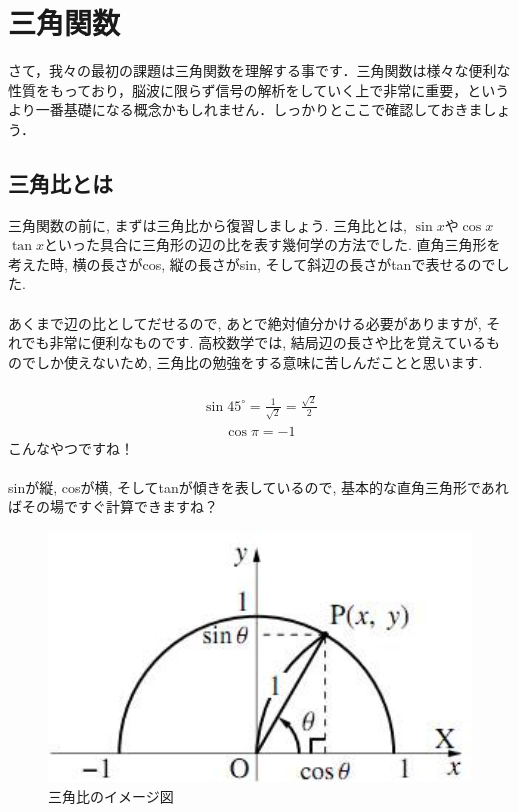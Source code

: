 \documentclass[11pt,a4paper]{jreport}
\begin{document}
\chapter{三角関数 \label{trigonometry}}
さて，我々の最初の課題は三角関数を理解する事です．三角関数は様々な便利な性質をもっており，脳波に限らず信号の解析をしていく上で非常に重要，というより一番基礎になる概念かもしれません．しっかりとここで確認しておきましょう．

\section{三角比とは}
三角関数の前に, まずは三角比から復習しましょう. 三角比とは, $\sin x$や$\cos x$ $\tan x$といった具合に三角形の辺の比を表す幾何学の方法でした. 直角三角形を考えた時, 横の長さがcos, 縦の長さがsin, そして斜辺の長さがtanで表せるのでした. \\
\\

あくまで辺の比としてだせるので, あとで絶対値分かける必要がありますが, それでも非常に便利なものです. 高校数学では, 結局辺の長さや比を覚えているものでしか使えないため, 三角比の勉強をする意味に苦しんだことと思います.\\
\\
\begin{eqnarray}
\sin 45^\circ = \frac{1}{\sqrt{2}} = \frac{\sqrt{2}}2
\end{eqnarray}
\begin{eqnarray}
\cos \pi = -1
\end{eqnarray}
こんなやつですね！\\
\\
sinが縦, cosが横, そしてtanが傾きを表しているので, 基本的な直角三角形であればその場ですぐ計算できますね？\\

\begin{figure}[H]
\label{im:trigonometry}
  \centering
  \includegraphics[width=120mm,bb=0 0 287 170]{../figures/trigonometry.png}
  \caption{三角比のイメージ図}
\end{figure}
\end{document}
